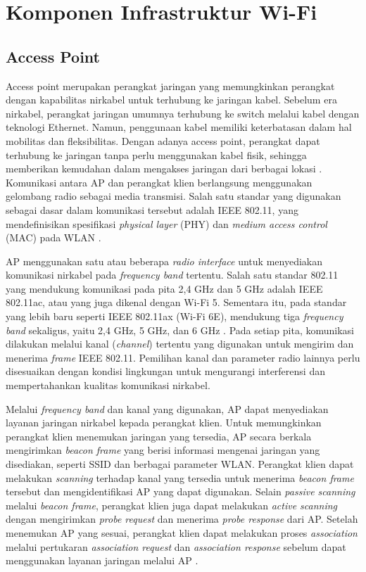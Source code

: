 \section{Komponen Infrastruktur Wi-Fi}

\subsection{Access Point}

Access point merupakan perangkat jaringan yang memungkinkan perangkat dengan kapabilitas nirkabel untuk terhubung ke jaringan kabel. Sebelum era nirkabel, perangkat jaringan umumnya terhubung ke switch melalui kabel dengan teknologi Ethernet. Namun, penggunaan kabel memiliki keterbatasan dalam hal mobilitas dan fleksibilitas. Dengan adanya access point, perangkat dapat terhubung ke jaringan tanpa perlu menggunakan kabel fisik, sehingga memberikan kemudahan dalam mengakses jaringan dari berbagai lokasi \parencite{CISCO_AP_2026}. Komunikasi antara AP dan perangkat klien berlangsung menggunakan gelombang radio sebagai media transmisi. Salah satu standar yang digunakan sebagai dasar dalam komunikasi tersebut adalah IEEE 802.11, yang mendefinisikan spesifikasi \textit{physical layer} (PHY) dan \textit{medium access control} (MAC) pada WLAN \parencite{IEEE_WLAN}.

AP menggunakan satu atau beberapa \textit{radio interface} untuk menyediakan komunikasi nirkabel pada \textit{frequency band} tertentu. Salah satu standar 802.11 yang mendukung komunikasi pada pita 2,4 GHz dan 5 GHz adalah IEEE 802.11ac, atau yang juga dikenal dengan Wi-Fi 5. Sementara itu, pada standar yang lebih baru seperti IEEE 802.11ax (Wi-Fi 6E), mendukung tiga \textit{frequency band} sekaligus, yaitu 2,4 GHz, 5 GHz, dan 6 GHz \parencite{GERACI_WIFI_2025}. Pada setiap pita, komunikasi dilakukan melalui kanal (\textit{channel}) tertentu yang digunakan untuk mengirim dan menerima \textit{frame} IEEE 802.11. Pemilihan kanal dan parameter radio lainnya perlu disesuaikan dengan kondisi lingkungan untuk mengurangi interferensi dan mempertahankan kualitas komunikasi nirkabel.

Melalui \textit{frequency band} dan kanal yang digunakan, AP dapat menyediakan layanan jaringan nirkabel kepada perangkat klien. Untuk memungkinkan perangkat klien menemukan jaringan yang tersedia, AP secara berkala mengirimkan \textit{beacon frame} yang berisi informasi mengenai jaringan yang disediakan, seperti SSID dan berbagai parameter WLAN. Perangkat klien dapat melakukan \textit{scanning} terhadap kanal yang tersedia untuk menerima \textit{beacon frame} tersebut dan mengidentifikasi AP yang dapat digunakan. Selain \textit{passive scanning} melalui \textit{beacon frame}, perangkat klien juga dapat melakukan \textit{active scanning} dengan mengirimkan \textit{probe request} dan menerima \textit{probe response} dari AP. Setelah menemukan AP yang sesuai, perangkat klien dapat melakukan proses \textit{association} melalui pertukaran \textit{association request} dan \textit{association response} sebelum dapat menggunakan layanan jaringan melalui AP \parencite{CISCO_80211_SNIFFING_2024}.

